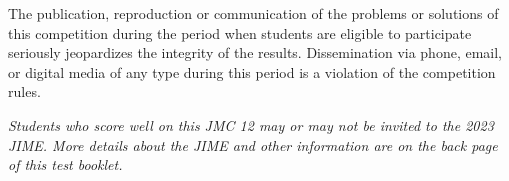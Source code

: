 \documentclass[10pt, twoside]{article}
\newcommand{\contestNumber}{12}
\newcommand{\JIMEYear}{2023}
\begin{document}
\begin{justify}
{\vspace{-6mm}

\begin{justify}
The publication, reproduction or communication of the problems or solutions of this competition during the period when students are eligible to participate seriously jeopardizes the integrity of the results. Dissemination via phone, email, or digital media of any type during this period is a violation of the competition rules.
\end{justify}

\vspace{-6mm}

\begin{justify}
\textit{Students who score well on this JMC {\contestNumber} may or may not be invited to the {\JIMEYear} JIME. More details about the JIME and other information are on the back page of this test booklet.}
\end{justify}}

\end{justify}

\restoregeometry

\newpage
\end{document}
